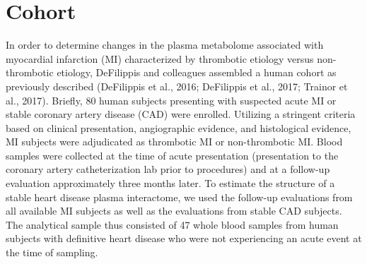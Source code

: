 \section{Cohort}

In order to determine changes in the plasma metabolome associated with myocardial infarction (MI) characterized by thrombotic etiology versus non-thrombotic etiology, DeFilippis and colleagues assembled a human cohort as previously described (DeFilippis et al., 2016; DeFilippis et al., 2017; Trainor et al., 2017). Briefly, 80 human subjects presenting with suspected acute MI or stable coronary artery disease (CAD) were enrolled. Utilizing a stringent criteria based on clinical presentation, angiographic evidence, and histological evidence, MI subjects were adjudicated as thrombotic MI or non-thrombotic MI. Blood samples were collected at the time of acute presentation (presentation to the coronary artery catheterization lab prior to procedures) and at a follow-up evaluation approximately three months later. To estimate the structure of a stable heart disease plasma interactome, we used the follow-up evaluations from all available MI subjects as well as the evaluations from stable CAD subjects. The analytical sample thus consisted of 47 whole blood samples from human subjects with definitive heart disease who were not experiencing an acute event at the time of sampling. 

